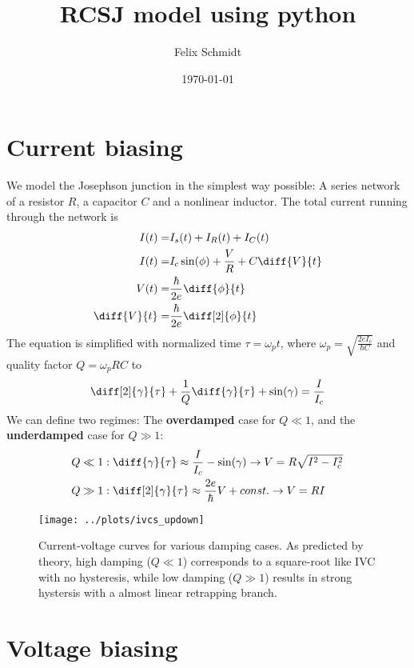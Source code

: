 \documentclass[reprint,onecolumn,%
amsmath,amssymb,aip,apl]{revtex4-1}
\begin{document}
	\title{RCSJ model using python}
	\author{Felix Schmidt}
	\date{\today}

	
	\maketitle
	
	\section{Current biasing}
	We model the Josephson junction in the simplest way possible:
	A series network of a resistor $R$, a capacitor $C$ and a nonlinear inductor.
	The total current running through the network is
	\begin{eqnarray}
	I(t) =& I_s(t) + I_R(t) + I_C(t) \\%
	I(t) =& I_c\sin(\phi) + \frac{V}{R} + C\diff{V}{t} \\%
	V(t) =& \frac{\hbar}{2e}\diff{\phi}{t} \\%
	\diff{V}{t} =& \frac{\hbar}{2e} \diff[2]{\phi}{t}
	\end{eqnarray}
	The equation is simplified with normalized time $\tau=\omega_p t$, where $\omega_p=\sqrt{\frac{2eI_c}{\hbar C}}$ and quality factor $Q=\omega_pRC$ to
	\begin{eqnarray}
	\diff[2]{\gamma}{\tau} + \frac{1}{Q}\diff{\gamma}{\tau} + \sin(\gamma) = \frac{I}{I_c}
	\end{eqnarray}
	We can define two regimes:
	The \textbf{overdamped} case for $Q\ll1$, and the \textbf{underdamped} case for $Q\gg1$:
	\begin{eqnarray}
	Q\ll1: \;& \diff{\gamma}{\tau}\approx\frac{I}{I_c}-\sin(\gamma) \rightarrow V=R\sqrt{I^2-I_c^2} \\%
	Q\gg1: \;& \diff[2]{\gamma}{\tau} \approx \frac{2e}{\hbar}V + const. \rightarrow V=RI
	\end{eqnarray}
	
	\begin{figure}
		\centering
		\texttt{[image: ../plots/ivcs\_updown]}
		\caption{Current-voltage curves for various damping cases.
			As predicted by theory, high damping ($Q\ll1$) corresponds to a square-root like IVC with no hysteresis, while low damping ($Q\gg1$) results in strong hystersis with a almost linear retrapping branch.}
		\label{fig:ivcsupdown}
	\end{figure}
	
	
	\section{Voltage biasing}
	
	
	
\end{document}

